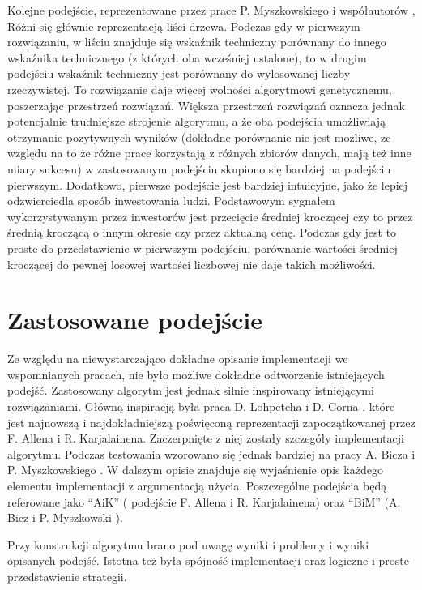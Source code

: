 \documentclass[twoside]{iisthesis}
\begin{document}
Kolejne podejście, reprezentowane przez prace P. Myszkowskiego i współautorów \cite{GPW}\cite{Bicz}, Różni się głównie reprezentacją liści drzewa. Podczas gdy w pierwszym rozwiązaniu, w liściu znajduje się wskaźnik techniczny porównany do innego wskaźnika technicznego (z których oba wcześniej ustalone), to w drugim podejściu wskaźnik techniczny jest porównany do wylosowanej liczby rzeczywistej. To rozwiązanie daje więcej wolności algorytmowi genetycznemu, poszerzając przestrzeń rozwiązań. Większa przestrzeń rozwiązań oznacza jednak potencjalnie trudniejsze strojenie algorytmu, a że oba podejścia umożliwiają otrzymanie pozytywnych wyników (dokładne porównanie nie jest możliwe, ze względu na to że różne prace korzystają z różnych zbiorów danych, mają też inne miary sukcesu) w zastosowanym podejściu skupiono się bardziej na podejściu pierwszym. Dodatkowo, pierwsze podejście jest bardziej intuicyjne, jako że lepiej odzwierciedla sposób inwestowania ludzi. Podstawowym sygnałem wykorzystywanym przez inwestorów jest przecięcie średniej kroczącej czy to przez średnią kroczącą o innym okresie czy przez aktualną cenę. Podczas gdy jest to proste do przedstawienie w pierwszym podejściu, porównanie wartości średniej kroczącej do pewnej losowej wartości liczbowej nie daje takich możliwości.


\chapter{Zastosowane podejście}

Ze względu na niewystarczająco dokładne opisanie implementacji we wspomnianych pracach, nie było możliwe dokładne odtworzenie istniejących podejść. Zastosowany algorytm jest jednak silnie inspirowany istniejącymi rozwiązaniami. Główną inspiracją była praca D. Lohpetcha i D. Corna \cite{5393324}, które jest najnowszą i najdokładniejszą poświęconą reprezentacji zapoczątkowanej przez  F. Allena i R. Karjalainena\cite{Allen1999245}. Zaczerpnięte z niej zostały szczegóły implementacji algorytmu. Podczas testowania wzorowano się jednak bardziej na pracy A. Bicza i P. Myszkowskiego \cite{Bicz}. W dalszym opisie znajduje się wyjaśnienie opis każdego elementu implementacji z argumentacją użycia. Poszczególne podejścia będą referowane jako ``AiK'' (  podejście F. Allena i R. Karjalainena\cite{Allen1999245}) oraz ``BiM'' (A. Bicz i P. Myszkowski \cite{Bicz}).

Przy konstrukcji algorytmu brano pod uwagę wyniki i problemy i wyniki opisanych podejść. Istotna też była spójność implementacji oraz logiczne i proste przedstawienie strategii.
\end{document}
